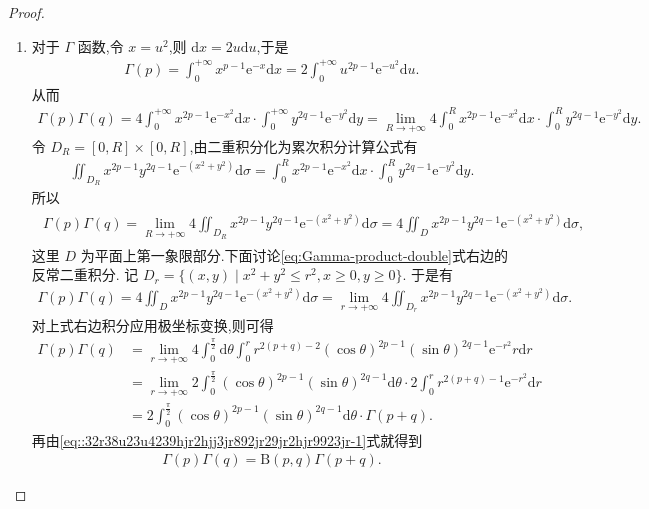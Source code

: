 \documentclass[../../main.tex]{subfiles}%
\begin{document}
\begin{proof}
\begin{enumerate}[(1)]
\item 对于 $\Gamma$ 函数,令 $x=u^2$,则 $\mathrm{d}x=2u\mathrm{d}u$,于是
\begin{align*}
\Gamma(p) = \int_{0}^{+\infty} x^{p-1}\mathrm{e}^{-x}\mathrm{d}x = 2\int_{0}^{+\infty} u^{2p-1}\mathrm{e}^{-u^2}\mathrm{d}u.
\end{align*}
从而
\begin{align*}
\Gamma(p)\Gamma(q) = 4\int_{0}^{+\infty} x^{2p-1}\mathrm{e}^{-x^2}\mathrm{d}x \cdot \int_{0}^{+\infty} y^{2q-1}\mathrm{e}^{-y^2}\mathrm{d}y 
= \lim_{R\to+\infty} 4\int_{0}^{R} x^{2p-1}\mathrm{e}^{-x^2}\mathrm{d}x \cdot \int_{0}^{R} y^{2q-1}\mathrm{e}^{-y^2}\mathrm{d}y.
\end{align*}
令 $D_R=[0,R]\times[0,R]$,由二重积分化为累次积分计算公式有
\begin{align*}
\iint_{D_R} x^{2p-1}y^{2q-1}\mathrm{e}^{-(x^2+y^2)}\mathrm{d}\sigma
= \int_{0}^{R} x^{2p-1}\mathrm{e}^{-x^2}\mathrm{d}x \cdot \int_{0}^{R} y^{2q-1}\mathrm{e}^{-y^2}\mathrm{d}y.
\end{align*}
所以
\begin{align}
\begin{split}
\Gamma(p)\Gamma(q) = \lim_{R\to+\infty} 4\iint_{D_R} x^{2p-1}y^{2q-1}\mathrm{e}^{-(x^2+y^2)}\mathrm{d}\sigma 
= 4\iint_{D} x^{2p-1}y^{2q-1}\mathrm{e}^{-(x^2+y^2)}\mathrm{d}\sigma,
\end{split}
\label{eq:Gamma-product-double}
\end{align}
这里 $D$ 为平面上第一象限部分.下面讨论\eqref{eq:Gamma-product-double}式右边的反常二重积分. 记
$D_r = \{(x,y)\mid x^2+y^2 \leqslant r^2, x \geqslant 0, y \geqslant 0\}$.
于是有
\begin{align*}
\Gamma(p)\Gamma(q) = 4\iint_{D} x^{2p-1}y^{2q-1}\mathrm{e}^{-(x^2+y^2)}\mathrm{d}\sigma 
= \lim_{r\to+\infty} 4\iint_{D_r} x^{2p-1}y^{2q-1}\mathrm{e}^{-(x^2+y^2)}\mathrm{d}\sigma.
\end{align*}
对上式右边积分应用极坐标变换,则可得
\begin{align*}
\Gamma(p)\Gamma(q) &= \lim_{r\to+\infty} 4\int_{0}^{\frac{\pi}{2}} \mathrm{d}\theta \int_{0}^{r} r^{2(p+q)-2}(\cos\theta)^{2p-1}(\sin\theta)^{2q-1}\mathrm{e}^{-r^2}r\mathrm{d}r \\
&= \lim_{r\to+\infty} 2\int_{0}^{\frac{\pi}{2}} (\cos\theta)^{2p-1}(\sin\theta)^{2q-1}\mathrm{d}\theta \cdot 2\int_{0}^{r} r^{2(p+q)-1}\mathrm{e}^{-r^2}\mathrm{d}r \\
&= 2\int_{0}^{\frac{\pi}{2}} (\cos\theta)^{2p-1}(\sin\theta)^{2q-1}\mathrm{d}\theta \cdot \Gamma(p+q).
\end{align*}
再由\eqref{eq::32r38u23u4239hjr2hjj3jr892jr29jr2hjr9923jr-1}式就得到
\begin{align*}
\Gamma(p)\Gamma(q) = \mathrm{B}(p,q)\Gamma(p+q).
\end{align*}
\end{enumerate}

\end{proof}
\end{document}
